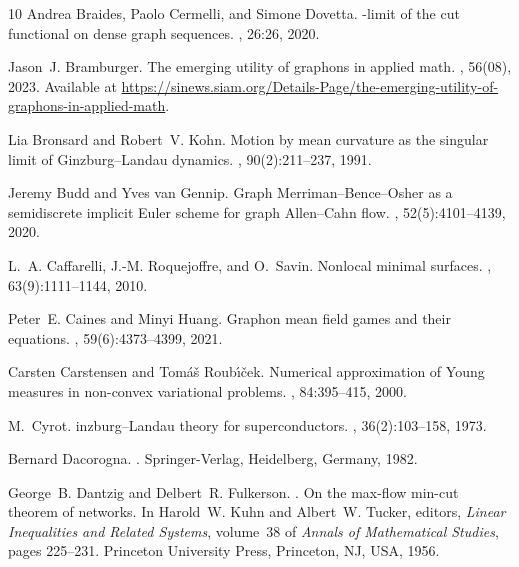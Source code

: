 \documentclass[11pt]{amsart}
\numberwithin{equation}{section}
\begin{document}
\begin{thebibliography}{10}
Andrea Braides, Paolo Cermelli, and Simone Dovetta.
\newblock {$\Gamma$}-limit of the cut functional on dense graph sequences.
, 26:26, 2020.

Jason~J. Bramburger.
\newblock The emerging utility of graphons in applied math.
, 56(08), 2023.
\newblock Available at
  \url{https://sinews.siam.org/Details-Page/the-emerging-utility-of-graphons-in-applied-math}.

Lia Bronsard and Robert~V. Kohn.
\newblock Motion by mean curvature as the singular limit of
  {G}inzburg--{L}andau dynamics.
, 90(2):211--237, 1991.

Jeremy Budd and Yves van Gennip.
\newblock Graph {M}erriman--{B}ence--{O}sher as a semidiscrete implicit {E}uler
  scheme for graph {A}llen--{C}ahn flow.
, 52(5):4101--4139, 2020.

L.~A. Caffarelli, J.-M. Roquejoffre, and O.~Savin.
\newblock Nonlocal minimal surfaces.
, 63(9):1111--1144, 2010.

Peter~E. Caines and Minyi Huang.
\newblock Graphon mean field games and their equations.
, 59(6):4373--4399, 2021.

Carsten Carstensen and Tom{\'a}{\v{s}} Roub{\'\i}{\v{c}}ek.
\newblock Numerical approximation of {Young} measures in non-convex variational
  problems.
, 84:395--415, 2000.

M.~Cyrot.
inzburg--{L}andau theory for superconductors.
, 36(2):103--158, 1973.

Bernard Dacorogna.
.
\newblock Springer-Verlag, Heidelberg, Germany, 1982.

George~B. Dantzig and Delbert~R. Fulkerson.
. {On} the max-flow min-cut theorem of networks.
\newblock In Harold~W. Kuhn and Albert~W. Tucker, editors, {\em Linear
  Inequalities and Related Systems}, volume~38 of {\em Annals of Mathematical
  Studies}, pages 225--231. Princeton University Press, Princeton, NJ, USA,
  1956.


\end{thebibliography}
\end{document}
